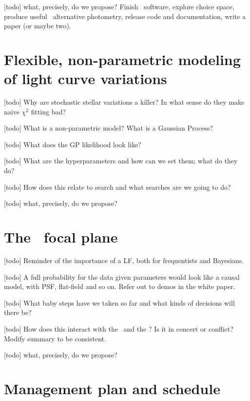\documentclass[letterpaper,12pt,preprint]{hack_aastex}
\begin{document}
[todo] what, precisely, do we propose?  Finish \OWL\ software, explore choice space, produce useful \Kepler\ alternative photometry, release code and documentation, write a paper (or maybe two).

\section{Flexible, non-parametric modeling of light curve variations}

[todo] Why are stochastic stellar variations a killer?  In what sense do they make naive $\chi^2$ fitting bad?

[todo] What is a non-parametric model?  What is a Gaussian Process?

[todo] What does the GP likelihood look like?

[todo] What are the hyperparameters and how can we set them; what do they do?

[todo] How does this relate to search and what searches are we going to do?

[todo] what, precisely, do we propose?


\section{The \Kepler\ focal plane}

[todo] Reminder of the importance of a LF, both for frequentists and Bayesians.

[todo] A full probability for the data given parameters would look like a causal model, with PSF, flat-field and so on.  Refer out to demos in the white paper.

[todo] What baby steps have we taken so far and what kinds of decisions will there be?

[todo] How does this interact with the \PLM\ and the \OWL?  Is it in concert or conflict?  Modify summary to be consistent.

[todo] what, precisely, do we propose?

\section{Management plan and schedule}
\end{document}
